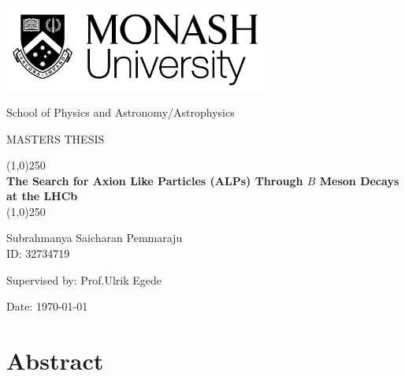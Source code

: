 \documentclass[11.5pt]{report}
\begin{document}
\label{firstpage}

\begin{titlepage}
    \begin{center}
        
        \vspace{1.5cm}
        \includegraphics[width=0.65\textwidth]{monashlogo.png}
        
        \large
        {School of Physics and Astronomy/Astrophysics}
        
        \vspace{2.5cm}
        \Large
        {MASTERS THESIS}
        
        \huge
        \line(1,0){250}\\
        \textbf{The Search for Axion Like Particles (ALPs) Through $B$ Meson Decays at the LHCb}\\
        \line(1,0){250}
        
        \vspace{2.0cm}
        \huge
        {Subrahmanya Saicharan Pemmaraju}\\
        \Large
        {ID: 32734719}
        
        \vspace{1.5cm}
        \huge
        {Supervised by: Prof.Ulrik Egede}
        
        \vspace{5.5cm}
        \Large
        {Date: \today}
        
    \end{center}
\end{titlepage}


\newpage
\chapter*{Abstract}

\newpage
\end{document}
